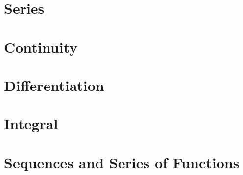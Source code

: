     \section{Series}
    
    \section{Continuity}
    
    \section{Differentiation}
    
    \section{Integral}
    
    \section{Sequences and Series of Functions}

